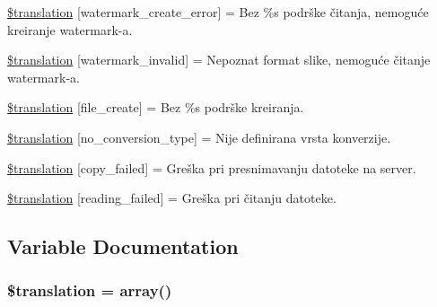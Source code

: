 \begin{DoxyCompactItemize}
\item 
\hyperlink{class_8upload_8hr___h_r_8php_aabca0b65dadbc6184415c16375f284ca}{\$translation} \mbox{[}\textquotesingle{}watermark\+\_\+create\+\_\+error\textquotesingle{}\mbox{]} = \textquotesingle{}Bez \%s podrške čitanja, nemoguće kreiranje watermark-\/a.\textquotesingle{}
\item 
\hyperlink{class_8upload_8hr___h_r_8php_ac336e7a5701e47ba4a05e9e498a3cc44}{\$translation} \mbox{[}\textquotesingle{}watermark\+\_\+invalid\textquotesingle{}\mbox{]} = \textquotesingle{}Nepoznat format slike, nemoguće čitanje watermark-\/a.\textquotesingle{}
\item 
\hyperlink{class_8upload_8hr___h_r_8php_a1ecb4673e4fb69e06b3f20b65cecf30a}{\$translation} \mbox{[}\textquotesingle{}file\+\_\+create\textquotesingle{}\mbox{]} = \textquotesingle{}Bez \%s podrške kreiranja.\textquotesingle{}
\item 
\hyperlink{class_8upload_8hr___h_r_8php_a4712d7ec28e9a7f17eb3338af2358363}{\$translation} \mbox{[}\textquotesingle{}no\+\_\+conversion\+\_\+type\textquotesingle{}\mbox{]} = \textquotesingle{}Nije definirana vrsta konverzije.\textquotesingle{}
\item 
\hyperlink{class_8upload_8hr___h_r_8php_a783c9358bcf54a054545b50098bc679b}{\$translation} \mbox{[}\textquotesingle{}copy\+\_\+failed\textquotesingle{}\mbox{]} = \textquotesingle{}Greška pri presnimavanju datoteke na server.\textquotesingle{}
\item 
\hyperlink{class_8upload_8hr___h_r_8php_a01bea14c9fd5f353f62db44beabfcd42}{\$translation} \mbox{[}\textquotesingle{}reading\+\_\+failed\textquotesingle{}\mbox{]} = \textquotesingle{}Greška pri čitanju datoteke.\textquotesingle{}
\end{DoxyCompactItemize}


\subsection{Variable Documentation}
\hypertarget{class_8upload_8hr___h_r_8php_a1f198d410fecc3871ebdd468d343a5e3}{}
\subsubsection[{\$translation}]{\setlength{\rightskip}{0pt plus 5cm}\$translation = array()}\label{class_8upload_8hr___h_r_8php_a1f198d410fecc3871ebdd468d343a5e3}
\hypertarget{class_8upload_8hr___h_r_8php_ac7498e49b9771b04698029aa61c70821}{}

